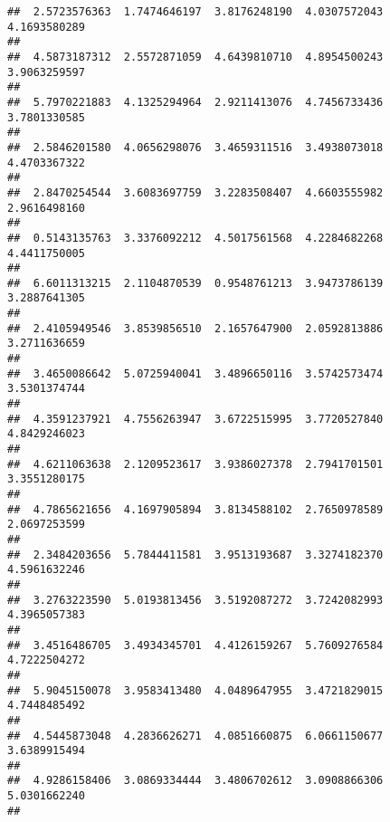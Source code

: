 \documentclass[]{article}
\begin{document}
\begin{verbatim}
##  2.5723576363  1.7474646197  3.8176248190  4.0307572043  4.1693580289 
##                                                                       
##  4.5873187312  2.5572871059  4.6439810710  4.8954500243  3.9063259597 
##                                                                       
##  5.7970221883  4.1325294964  2.9211413076  4.7456733436  3.7801330585 
##                                                                       
##  2.5846201580  4.0656298076  3.4659311516  3.4938073018  4.4703367322 
##                                                                       
##  2.8470254544  3.6083697759  3.2283508407  4.6603555982  2.9616498160 
##                                                                       
##  0.5143135763  3.3376092212  4.5017561568  4.2284682268  4.4411750005 
##                                                                       
##  6.6011313215  2.1104870539  0.9548761213  3.9473786139  3.2887641305 
##                                                                       
##  2.4105949546  3.8539856510  2.1657647900  2.0592813886  3.2711636659 
##                                                                       
##  3.4650086642  5.0725940041  3.4896650116  3.5742573474  3.5301374744 
##                                                                       
##  4.3591237921  4.7556263947  3.6722515995  3.7720527840  4.8429246023 
##                                                                       
##  4.6211063638  2.1209523617  3.9386027378  2.7941701501  3.3551280175 
##                                                                       
##  4.7865621656  4.1697905894  3.8134588102  2.7650978589  2.0697253599 
##                                                                       
##  2.3484203656  5.7844411581  3.9513193687  3.3274182370  4.5961632246 
##                                                                       
##  3.2763223590  5.0193813456  3.5192087272  3.7242082993  4.3965057383 
##                                                                       
##  3.4516486705  3.4934345701  4.4126159267  5.7609276584  4.7222504272 
##                                                                       
##  5.9045150078  3.9583413480  4.0489647955  3.4721829015  4.7448485492 
##                                                                       
##  4.5445873048  4.2836626271  4.0851660875  6.0661150677  3.6389915494 
##                                                                       
##  4.9286158406  3.0869334444  3.4806702612  3.0908866306  5.0301662240 
##                                                                       

\end{verbatim}
\end{document}
